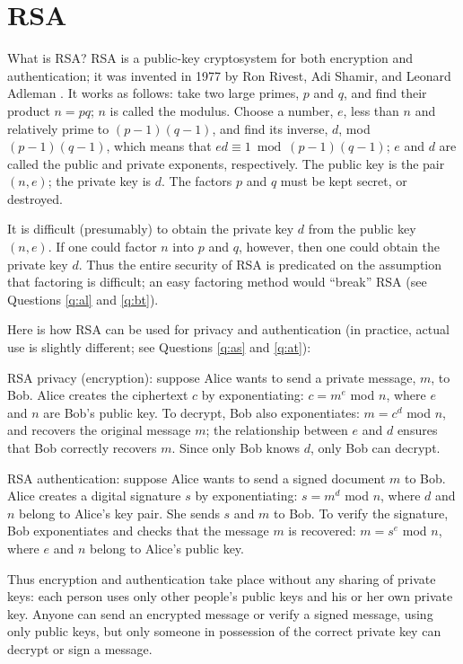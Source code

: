 \section {RSA}
{What is RSA?}
RSA is a public-key cryptosystem for both encryption and authentication;
it was invented in 1977 by Ron Rivest, Adi Shamir, and Leonard Adleman
\cite{rsa}. It works as follows: take two large primes, $p$ and $q$, and 
find their product $n = pq$; $n$ is called the modulus. Choose a number, 
$e$, less than $n$ and relatively prime to $(p-1)(q-1)$, and find its 
inverse, $d$, mod $(p-1)(q-1)$, which means that $ed \equiv 1 \bmod 
(p-1)(q-1)$; $e$ and $d$ are called the public and private exponents, 
respectively. The public key is the pair $(n,e)$; the private key is $d$. 
The factors $p$ and $q$ must be kept secret, or destroyed. 

It is difficult (presumably) to obtain the private key $d$ from the public 
key $(n,e)$. If one could factor $n$ into $p$ and $q$, however, then one 
could obtain the private key $d$. Thus the entire security of RSA is 
predicated on the assumption that factoring is difficult; an easy factoring 
method would ``break'' RSA (see Questions \ref{q:al} and \ref{q:bt}).

Here is how RSA can be used for privacy and authentication (in practice, 
actual use is slightly different; see Questions \ref{q:as} and \ref{q:at}):

RSA privacy (encryption): suppose Alice wants to send a private message, 
$m$, to Bob. Alice creates the ciphertext $c$ by exponentiating: $c = m^e$ 
mod $n$, where $e$ and $n$ are Bob's public key. To decrypt, Bob also 
exponentiates: $m = c^d$ mod $n$, and recovers the original message $m$;
the relationship between $e$ and $d$ ensures that Bob correctly recovers $m$.
Since only Bob knows $d$, only Bob can decrypt. 

RSA authentication: suppose Alice wants to send a signed document $m$ to Bob. 
Alice creates a digital signature $s$ by exponentiating: $s = m^d$ mod $n$, 
where $d$ and $n$ belong to Alice's key pair. She sends $s$ and $m$ to Bob. 
To verify the signature, Bob exponentiates and checks that the message $m$ 
is recovered: $m = s^e$ mod $n$, where $e$ and $n$ belong to Alice's public 
key.

Thus encryption and authentication take place without any sharing of 
private keys: each person uses only other people's public keys and his or 
her own private key. Anyone can send an encrypted message or verify a signed 
message, using only public keys, but only someone in possession of the correct 
private key can decrypt or sign a message. 

